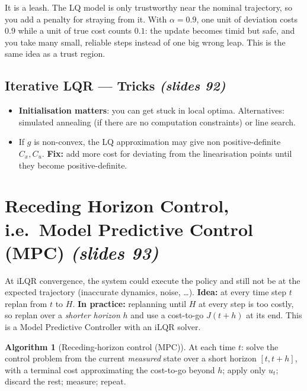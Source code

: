 \documentclass[11pt,a4paper]{article}
\newcommand{\slides}[1]{\emph{(slides #1)}}
\theoremstyle{plain}
\theoremstyle{definition}
\newtheorem{algorithm}[theorem]{Algorithm}
\theoremstyle{remark}
\begin{document}
\begin{intuition}
It is a leash. The LQ model is only trustworthy near the nominal trajectory, so you add a penalty for straying from it. With $\alpha=0.9$, one unit of deviation costs $0.9$ while a unit of true cost counts $0.1$: the update becomes timid but safe, and you take many small, reliable steps instead of one big wrong leap. This is the same idea as a trust region.
\end{intuition}

\subsection{Iterative LQR --- Tricks \slides{92}}

\begin{itemize}[nosep]
  \item \textbf{Initialisation matters}: you can get stuck in local optima. Alternatives: simulated annealing (if there are no computation constraints) or line search.
  \item If $g$ is non-convex, the LQ approximation may give non positive-definite $C_x,C_u$. \textbf{Fix:} add more cost for deviating from the linearisation points until they become positive-definite.
\end{itemize}

\section{Receding Horizon Control, i.e.\ Model Predictive Control (MPC) \slides{93}}

At iLQR convergence, the system could execute the policy and still not be at the expected trajectory (inaccurate dynamics, noise, \dots). \textbf{Idea:} at every time step $t$ replan from $t$ to $H$. \textbf{In practice:} replanning until $H$ at every step is too costly, so replan over a \emph{shorter horizon} $h$ and use a cost-to-go $J(t+h)$ at its end. This is a Model Predictive Controller with an iLQR solver.

\begin{algorithm}[Receding-horizon control (MPC)]\label{alg:mpc}
At each time $t$: solve the control problem from the current \emph{measured} state over a short horizon $[t,t+h]$, with a terminal cost approximating the cost-to-go beyond $h$; apply only $u_t$; discard the rest; measure; repeat.
\end{algorithm}
\end{document}
